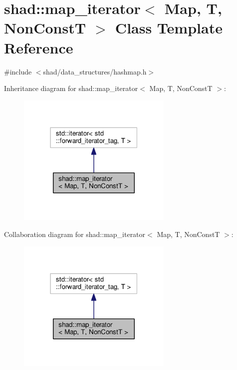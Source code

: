 \hypertarget{classshad_1_1map__iterator}{\section{shad\-:\-:map\-\_\-iterator$<$ Map, T, Non\-Const\-T $>$ Class Template Reference}
\label{classshad_1_1map__iterator}
}


{\ttfamily \#include $<$shad/data\-\_\-structures/hashmap.\-h$>$}



Inheritance diagram for shad\-:\-:map\-\_\-iterator$<$ Map, T, Non\-Const\-T $>$\-:
\nopagebreak
\begin{figure}[H]
\begin{center}
\leavevmode
\includegraphics[width=210pt]{classshad_1_1map__iterator__inherit__graph}
\end{center}
\end{figure}


Collaboration diagram for shad\-:\-:map\-\_\-iterator$<$ Map, T, Non\-Const\-T $>$\-:
\nopagebreak
\begin{figure}[H]
\begin{center}
\leavevmode
\includegraphics[width=210pt]{classshad_1_1map__iterator__coll__graph}
\end{center}
\end{figure}
